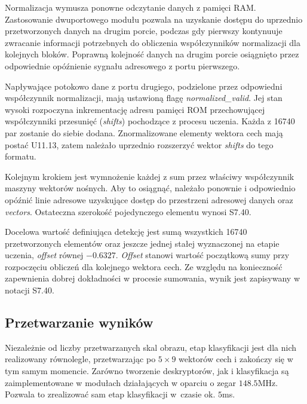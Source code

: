 Normalizacja wymusza ponowne odczytanie danych z pamięci RAM. 
Zastosowanie dwuportowego modułu pozwala na uzyskanie dostępu do uprzednio przetworzonych danych na drugim porcie, podczas gdy pierwszy kontynuuje zwracanie informacji potrzebnych do obliczenia współczynników normalizacji dla kolejnych bloków. 
Poprawną kolejność danych na drugim porcie osiągnięto przez odpowiednie opóźnienie sygnału adresowego z portu pierwszego. 

Napływające potokowo dane z portu drugiego, podzielone przez odpowiedni współczynnik normalizacji, mają ustawioną flagę \textit{normalized\_valid}.
Jej stan wysoki rozpoczyna inkrementację adresu pamięci ROM przechowującej współczynniki przesunięć (\textit{shifts}) pochodzące z procesu uczenia. 
Każda z 16740 par zostanie do siebie dodana. 
Znormalizowane elementy wektora cech mają postać U11.13, zatem należało uprzednio rozszerzyć wektor \textit{shifts} do tego formatu. 

Kolejnym krokiem jest wymnożenie każdej z sum przez właściwy współczynnik maszyny wektorów nośnych. 
Aby to osiągnąć, należało ponownie i odpowiednio opóźnić linie adresowe uzyskujące dostęp do przestrzeni adresowej danych oraz \textit{vectors}. 
Ostateczna szerokość pojedynczego elementu wynosi S7.40.


Docelowa wartość definiująca detekcję jest sumą wszystkich 16740 przetworzonych elementów oraz jeszcze jednej stałej wyznaczonej na etapie uczenia, \textit{offset} równej $-0.6327$. 
\mbox{\textit{Offset}} stanowi wartość początkową sumy przy rozpoczęciu obliczeń dla kolejnego wektora cech.
Ze względu na konieczność zapewnienia dobrej dokładności w procesie sumowania, wynik jest zapisywany w notacji S7.40.

\subsection{Przetwarzanie wyników}

Niezależnie od liczby przetwarzanych skal obrazu, etap klasyfikacji jest dla nich realizowany równolegle, przetwarzając po $5\times 9$ wektorów cech i zakończy się w tym samym momencie. 
Zarówno tworzenie deskryptorów, jak i klasyfikacja są zaimplementowane w modułach działających w oparciu o zegar $148.5$MHz. 
Pozwala to zrealizować sam etap klasyfikacji w~czasie ok. $5$ms.

